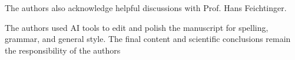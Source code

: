 \documentclass{article}
\newtheorem{theorem}{Theorem}[section]
\begin{document}
The authors also acknowledge helpful discussions with Prof. Hans Feichtinger.

The authors used AI tools to edit and polish the manuscript for spelling, grammar, and
general style. The final content and scientific conclusions remain the responsibility of the
authors







    
\end{document}
